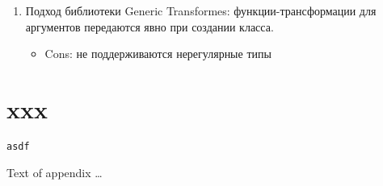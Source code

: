\documentclass[acmsmall,review,anonymous]{acmart}\settopmatter{printfolios=true,printccs=false,printacmref=false}
\begin{document}
\begin{enumerate}
  \item Подход библиотеки Generic Transformes: функции-трансформации для аргументов передаются явно при создании класса.
    \begin{itemize}
    \item Cons: не поддерживаются нерегулярные типы
    \end{itemize}
    
\end{enumerate}


\section{xxx}
\begin{lstlisting}
asdf
\end{lstlisting}

%


Text of appendix \ldots
\end{document}
